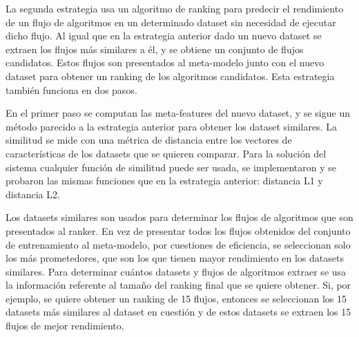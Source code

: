 
La segunda estrategia usa un algoritmo de ranking para predecir el rendimiento de un flujo de algoritmos en un determinado dataset sin necesidad de ejecutar dicho flujo. Al igual que en la estrategia anterior dado un nuevo dataset se extraen los flujos más similares a él, y se obtiene un conjunto de flujos candidatos. Estos flujos son presentados al meta-modelo junto con el nuevo dataset para obtener un ranking de los algoritmos candidatos. Esta estrategia también funciona en dos pasos.

En el primer paso se computan las meta-features del nuevo dataset, y se sigue un método parecido a la estrategia anterior para obtener los dataset similares. La similitud se mide con una métrica de distancia entre los vectores de características de los datasets que se quieren comparar. Para la solución del sistema cualquier función de similitud puede ser usada, se implementaron y se probaron las mismas funciones que en la estrategia anterior: distancia L1 y distancia L2.

Los datasets similares son usados para determinar los flujos de algoritmos que son presentados al ranker. En vez de presentar todos los flujos obtenidos del conjunto de entrenamiento al meta-modelo, por cuestiones de eficiencia, se seleccionan solo los más prometedores, que son los que tienen mayor rendimiento en los datasets similares. Para determinar cuántos datasets y flujos de algoritmos extraer se usa la información referente al tamaño del ranking final que se quiere obtener. Si, por ejemplo, se quiere obtener un ranking de 15 flujos, entonces se seleccionan los 15 datasets más similares al dataset en cuestión y de estos datasets se extraen los 15 flujos de mejor rendimiento. 

